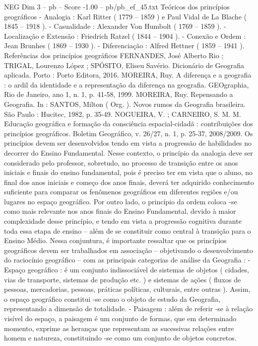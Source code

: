 \begin{textsample}{NEG Dim 3 – pb – Score -1.00 – pb/pb\_ef\_45.txt}
Teóricos dos princípios geográficos - Analogia : Karl Ritter ( 1779 – 1859 ) e Paul Vidal de La Blache ( 1845 – 1918 ). - Casualidade : Alexander Von Humbolt ( 1769 – 1859 ). - Localização e Extensão : Friedrich Ratzel ( 1844 – 1904 ). - Conexão e Ordem : Jean Brunhes ( 1869 – 1930 ). - Diferenciação : Alfred Hettner ( 1859 – 1941 ).
Referências dos princípios geográficos FERNANDES, José Alberto Rio ; TRIGAL, Lourenzo López ; SPÓSITO, Eliseu Savério.
Dicionário de Geografia aplicada.
Porto : Porto Editora, 2016.
MOREIRA, Ruy.
A diferença e a geografia : o ardil da identidade e a representação da diferença na geografia.
GEOgraphia, Rio de Janeiro, ano 1, n. 1, p. 41-58, 1999.
MOREIRA, Ruy.
Repensando a Geografia.
In : SANTOS, Milton ( Org. ).
Novos rumos da Geografia brasileira.
São Paulo : Hucitec, 1982, p. 35-49.
NOGUEIRA, V. ; CARNEIRO, S.
M.
M.
Educação geográfica e formação da consciência espacial-cidadã : contribuições dos princípios geográficos.
Boletim Geográfico, v. 26/27, n. 1, p. 25-37, 2008/2009.
Os princípios devem ser desenvolvidos tendo em vista a progressão de habilidades no decorrer do Ensino Fundamental.
Nesse contexto, o princípio da analogia deve ser considerado pelo professor, sobretudo, no processo de transição entre os anos iniciais e finais do ensino fundamental, pois é preciso ter em vista que o aluno, no final dos anos iniciais e começo dos anos finais, deverá ter adquirido conhecimento suficiente para comparar os fenômenos geográficos em diferentes regiões e/ou lugares no espaço geográfico.
Por outro lado, o princípio da ordem coloca -se como mais relevante nos anos finais do Ensino Fundamental, devido à maior complexidade desse princípio, e tendo em vista a progressão cognitiva durante toda essa etapa de ensino – além de se constituir como central à transição para o Ensino Médio.
Nessa conjuntura, é importante ressaltar que os princípios geográficos devem ser trabalhados em associação – objetivando o desenvolvimento do raciocínio geográfico – com as principais categorias de análise da Geografia : - Espaço geográfico : é um conjunto indissociável de sistemas de objetos ( cidades, vias de transporte, sistemas de produção etc. ) e sistemas de ações ( fluxos de pessoas, mercadorias, pessoas, práticas políticas, culturais, entre outras ).
Assim, o espaço geográfico constitui -se como o objeto de estudo da Geografia, representando a dimensão de totalidade. - Paisagem : além de referir -se à relação visível do espaço, a paisagem é um conjunto de formas, que em determinado momento, exprime as heranças que representam as sucessivas relações entre homem e natureza, constituindo -se como um conjunto de objetos concretos.

\end{textsample}
